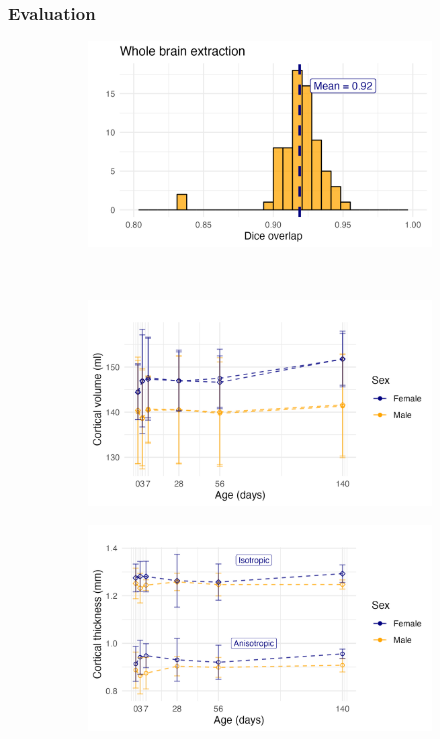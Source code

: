 \documentclass[
  12pt,
]{article}
\begin{document}
\hypertarget{evaluation}{%
\subsubsection{Evaluation}\label{evaluation}}

\begin{figure}
\centering
\begin{subfigure}{0.5\textwidth}
  \centering
  \includegraphics[width=\linewidth]{Figures/diceWholeBrain.png}
  \caption{}
  \label{fig:suba}
\end{subfigure}\\
\begin{subfigure}{0.5\textwidth}
  \centering
  \includegraphics[width=\linewidth]{Figures/corticoPlot.png}
  \caption{}
  \label{fig:subb}
\end{subfigure}%
\begin{subfigure}{.5\textwidth}
  \centering
  \includegraphics[width=\linewidth]{Figures/kkPlot.png}

\end{subfigure}
\end{figure}
\end{document}
